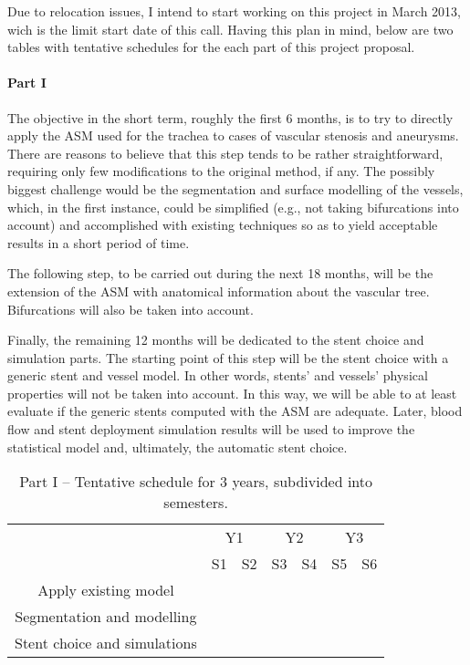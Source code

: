 Due to relocation issues, I intend to start working on this project in March 2013, wich is the limit start date of this call. Having this plan in mind, below are two tables with tentative schedules for the each part of this project proposal.

\paragraph{Part I}
The objective in the short term, roughly the first 6 months, is to try to directly apply the ASM used for the trachea to cases of vascular stenosis and aneurysms. There are reasons to believe that this step tends to be rather straightforward, requiring only few modifications to the original method, if any. The possibly biggest challenge would be the segmentation and surface modelling of the vessels, which, in the first instance, could be simplified (e.g., not taking bifurcations into account) and accomplished with existing techniques so as to yield acceptable results in a short period of time. 

The following step, to be carried out during the next 18 months, will be the extension of the ASM with anatomical information about the vascular tree. Bifurcations will also be taken into account. 

Finally, the remaining 12 months will be dedicated to the stent choice and simulation parts. The starting point of this step will be the stent choice with a generic stent and vessel model. In other words, stents' and vessels' physical properties will not be taken into account. In this way, we will be able to at least evaluate if the generic stents computed with the ASM are adequate. Later, blood flow and stent deployment simulation results will be used to improve the statistical model and, ultimately, the automatic stent choice.  

\begin{table}[h]\centering
\begin{tabular}{c|c|c|c|c|c|c|}
\cline{2-7}
 & \multicolumn{2}{|c|}{Y1} & \multicolumn{2}{|c|}{Y2} & \multicolumn{2}{|c|}{Y3} \\ \cline{2-7}
 & S1 & S2 & S3 & S4 & S5 & S6 \\ \hline
\multicolumn{1}{|c|}{Apply existing model} & \cellcolor{green} & & & & & \\ \hline
\multicolumn{1}{|c|}{Segmentation and modelling} & & \cellcolor{green} & \cellcolor{green} & \cellcolor{green} & & \\ \hline
\multicolumn{1}{|c|}{Stent choice and simulations} & & & & & \cellcolor{green} & \cellcolor{green} \\ \hline
\end{tabular}
\caption{Part I -- Tentative schedule for 3 years, subdivided into semesters.}
\label{tab:schedule1}
\end{table}

